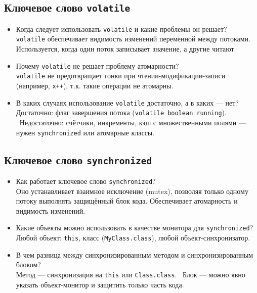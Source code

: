 \documentclass[a4paper,14pt]{article}
\begin{document}
\subsection{Ключевое слово \texttt{volatile}}

\begin{itemize}
\item Когда следует использовать \texttt{volatile} и какие проблемы он решает? \\
\texttt{volatile} обеспечивает видимость изменений переменной между потоками. Используется, когда один поток записывает значение, а другие читают.

\item Почему \texttt{volatile} не решает проблему атомарности? \\
\texttt{volatile} не предотвращает гонки при чтении-модификации-записи (например, \texttt{x++}), т.к. такие операции не атомарны.

\item В каких случаях использование \texttt{volatile} достаточно, а в каких — нет? \\
Достаточно: флаг завершения потока (\texttt{volatile boolean running}). \
Недостаточно: счётчики, инкременты, кэш с множественными полями — нужен \texttt{synchronized} или атомарные классы.
\end{itemize}

\subsection{Ключевое слово \texttt{synchronized}}

\begin{itemize}
\item Как работает ключевое слово \texttt{synchronized}? \\
Оно устанавливает взаимное исключение (mutex), позволяя только одному потоку выполнять защищённый блок кода. Обеспечивает атомарность и видимость изменений.

\item Какие объекты можно использовать в качестве монитора для \texttt{synchronized}? \\
Любой объект: \texttt{this}, класс (\texttt{MyClass.class}), любой объект-синхронизатор.

\item В чем разница между синхронизированным методом и синхронизированным блоком? \\
Метод — синхронизация на \texttt{this} или \texttt{Class.class}. \
Блок — можно явно указать объект-монитор и защитить только часть кода.
\end{itemize}
\end{document}
